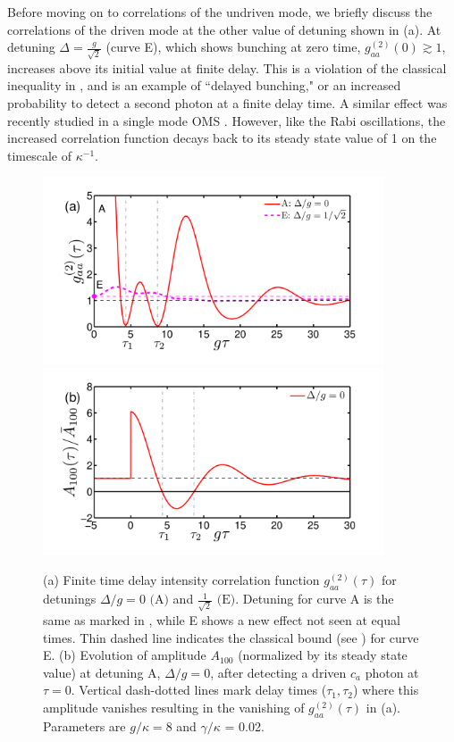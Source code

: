 Before moving on to correlations of the undriven mode,
we briefly discuss the correlations of the driven mode at the
 other value of  detuning shown in 
(a).
 At detuning
$\Delta = \frac{g}{\sqrt{2}}$ (curve E),
which shows bunching at zero time,
$g^{(2)}_{aa}(0) \gtrsim 1$, 
increases  above its initial value at
finite delay.
This is a violation of the classical inequality in
, 
and is an example of ``delayed bunching,"
or an increased probability to detect a second
photon at a finite delay time.
A similar effect was recently studied
in a single mode OMS \cite{Kronwald2012}.
However, like the Rabi oscillations,
the increased correlation function decays back to its steady state
value of 1 on
the timescale of $\kappa^{-1}$.
\begin{figure} 
\centering
  \includegraphics[width=0.9\textwidth]{./figs_Komar2013/fig5a.pdf}\\[-0.5cm]
  \includegraphics[width=0.9\textwidth]{./figs_Komar2013/fig5b.pdf}
  \caption{
  \label{fig:g2aatau}
  (a) Finite time delay intensity
  correlation function $g^{(2)}_{aa}(\tau)$  for detunings
  $\Delta/g = 0 \text{ (A)}$ and $\frac{1}{\sqrt{2}}
  \text{ (E)}$.
  Detuning for curve A is the same as marked in ,
  while E shows a new effect not seen at equal times.
  Thin dashed line indicates the classical bound 
  (see ) for curve E. 
  (b) Evolution of amplitude $A_{100}$ (normalized by its
  steady state value)
  at detuning A, $\Delta/g = 0$,
  after detecting a driven $c_a$ photon at $\tau = 0$. 
  Vertical dash-dotted lines mark delay times ($\tau_1, \tau_2$) where this amplitude
  vanishes resulting in the vanishing of $g^{(2)}_{aa}(\tau)$
  in (a).
  Parameters are $g/\kappa = 8$ and $\gamma/\kappa$ = 0.02. 
  } 
\end{figure}




